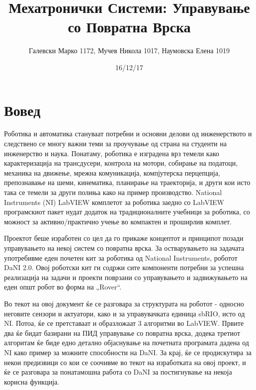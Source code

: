 \documentclass{article}
\title{Мехатронички Системи: Управување со Повратна Врска}
\date{16/12/17}
\author{Галевски Марко 1172, Мучев Никола 1017, Наумовска Елена 1019}
\begin{document}
    \maketitle{}
    \newpage
    \tableofcontents
    \newpage
    
\section{Вовед}
Роботика и автоматика стануваат потребни и основни делови од инженерството и следствено се многу важни теми за проучување од страна на студенти на инженерство и наука. Понатаму, роботика е изградена врз темели како карактеризација на трансдусери, контрола на мотори, собирање на податоци, механика на движење, мрежна комуникација, компјутерска перцепција, препознавање на шеми, кинематика, планирање на траекторија, и други кои исто така се темели за други полиња како на пример производство. National Instruments (NI) LabVIEW комплетот за роботика заедно со LabVIEW програмскиот пакет нудат додаток на традиционалните учебници за роботика, со можност за активно/практично учење во компактен и проширлив комплет.

Проектот беше изработен со цел да го прикаже концептот и принципот позади управувањето на некој систем со повратна врска. За остварувањето на задачата употребивме еден почетен кит за роботика од National Instruments, роботот DaNI 2.0. Овој роботски кит ги содржи сите компоненти потребни за успешна реализација на задачи и проекти поврзани со управувањето и задвижувањето на еден општ робот во форма на „Rover“. 

Во текот на овој документ ќе се разговара за структурата на роботот - односно неговите сензори и актуатори, како и за управувачката единица sbRIO, исто од NI. Потоа, ќе се претставаат и образложаат 3 алгоритми во LabVIEW. Првите два ќе бидат базирани на ПИД управување со повратна врска, додека третиот алгоритам ќе биде едно детално објаснување на почетната програмата дадена од NI како пример за можните способности на DaNI. За крај, ќе се продискутира за некои предизвици со кои се соочивме во текот на изработката на овој проект, и ќе се разговара за понатамошна работа со DaNI за постигнување на некоја корисна функција.
\end{document}
